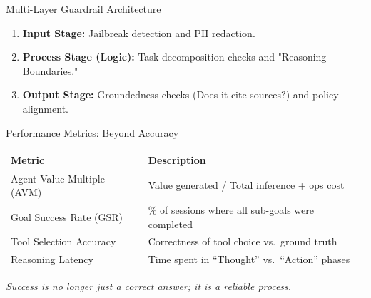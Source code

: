 \documentclass{beamer}       %
\begin{document}
\begin{frame}{Multi-Layer Guardrail Architecture}
    \centering
    
    \vspace{0.3cm}
    \begin{enumerate}
        \item \textbf{Input Stage:} Jailbreak detection and PII redaction.
        \item \textbf{Process Stage (Logic):} Task decomposition checks and "Reasoning Boundaries."
        \item \textbf{Output Stage:} Groundedness checks (Does it cite sources?) and policy alignment.
    \end{enumerate}
\end{frame}

\begin{frame}{Performance Metrics: Beyond Accuracy}
    \small
    \begin{table}[]
        \centering
        \begin{tabular}{@{}p{3.2cm}p{6.5cm}@{}}
            \toprule
            \textbf{Metric} & \textbf{Description} \\ \midrule
            Agent Value Multiple (AVM) & Value generated / Total inference + ops cost \\[4pt]
            Goal Success Rate (GSR) & \% of sessions where all sub-goals were completed \\[4pt]
            Tool Selection Accuracy & Correctness of tool choice vs.\ ground truth \\[4pt]
            Reasoning Latency & Time spent in ``Thought'' vs.\ ``Action'' phases \\ \bottomrule
        \end{tabular}
    \end{table}
    \vfill
    \centering
    \textit{Success is no longer just a correct answer; it is a reliable process.}
\end{frame}
\end{document}
